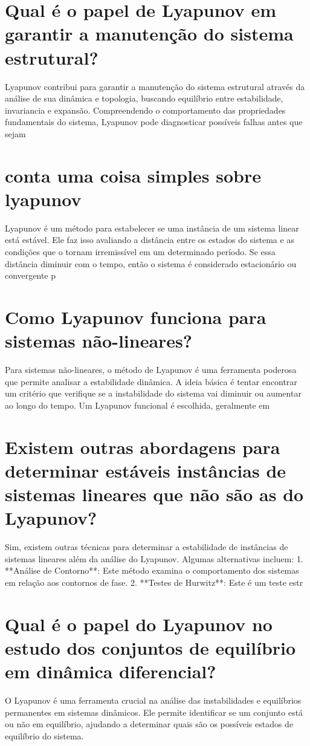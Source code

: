 \documentclass[11pt,a4paper]{article}
\begin{document}
\section{Qual é o papel de Lyapunov em garantir a manutenção do sistema estrutural?}
Lyapunov contribui para garantir a manutenção do sistema estrutural através da análise de sua dinâmica e topologia, buscando equilíbrio entre estabilidade, invariancia e expansão. Compreendendo o comportamento das propriedades fundamentais do sistema, Lyapunov pode diagnosticar possíveis falhas antes que sejam

\section{conta uma coisa simples sobre lyapunov}
Lyapunov é um método para estabelecer se uma instância de um sistema linear está estável. Ele faz isso avaliando a distância entre os estados do sistema e as condições que o tornam irremissível em um determinado período. Se essa distância diminuir com o tempo, então o sistema é considerado estacionário ou convergente p

\section{Como Lyapunov funciona para sistemas não-lineares?}
Para sistemas não-lineares, o método de Lyapunov é uma ferramenta poderosa que permite analisar a estabilidade dinâmica. A ideia básica é tentar encontrar um critério que verifique se a instabilidade do sistema vai diminuir ou aumentar ao longo do tempo. Um Lyapunov funcional é escolhida, geralmente em

\section{Existem outras abordagens para determinar estáveis instâncias de sistemas lineares que não são as do Lyapunov?}
Sim, existem outras técnicas para determinar a estabilidade de instâncias de sistemas lineares além da análise do Lyapunov. Algumas alternativas incluem: 1. **Análise de Contorno**: Este método examina o comportamento dos sistemas em relação aos contornos de fase. 2. **Testes de Hurwitz**: Este é um teste estr

\section{Qual é o papel do Lyapunov no estudo dos conjuntos de equilíbrio em dinâmica diferencial?}
O Lyapunov é uma ferramenta crucial na análise das instabilidades e equilíbrios permanentes em sistemas dinâmicos. Ele permite identificar se um conjunto está ou não em equilíbrio, ajudando a determinar quais são os possíveis estados de equilíbrio do sistema.
\end{document}
